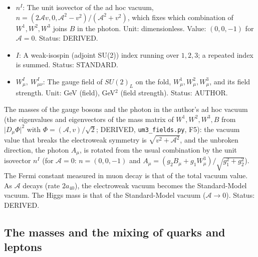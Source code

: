 \documentclass[
  10pt,
]{article}
\begin{document}
\begin{itemize}
  \(B_\mu,\ B_{\mu\nu}\): The hypercharge gauge field of \(U(1)_Y\) on
  the fold and its field strength. Unit: GeV (field), GeV\(^2\) (field
  strength). Status: AUTHOR.
\item
  \(n^I\): The unit isovector of the ad hoc vacuum,
  \(n = (2\mathcal{A}v, 0, \mathcal{A}^2 - v^2)/(\mathcal{A}^2 + v^2)\),
  which fixes which combination of \(W^1, W^2, W^3\) joins \(B\) in the
  photon. Unit: dimensionless. Value: \((0, 0, -1)\) for
  \(\mathcal{A} = 0\). Status: DERIVED.
\item
  \(I\): A weak-isospin (adjoint SU(2)) index running over \(1, 2, 3\);
  a repeated index is summed. Status: STANDARD.
\item
  \(W^I_\mu,\ W^I_{\mu\nu}\): The gauge field of \(SU(2)_L\) on the
  fold, \(W^1_\mu, W^2_\mu, W^3_\mu\), and its field strength. Unit: GeV
  (field), GeV\(^2\) (field strength). Status: AUTHOR.
\end{itemize}

The masses of the gauge bosons and the photon in the author's ad hoc
vacuum (the eigenvalues and eigenvectors of the mass matrix of
\(W^1, W^2, W^3, B\) from \(\lvert D_\mu\Phi\rvert^2\) with
\(\Phi = (\mathcal{A}, v)/\sqrt2\); DERIVED, \texttt{um3\_fields.py},
F5): the vacuum value that breaks the electroweak symmetry is
\(\sqrt{v^2 + \mathcal{A}^2}\), and the unbroken direction, the photon
\(A_\mu\), is rotated from the usual combination by the unit isovector
\(n^I\) (for \(\mathcal{A} = 0\): \(n = (0, 0, -1)\) and
\(A_\mu = (g_2B_\mu + g_1W^3_\mu)/\sqrt{g_1^2 + g_2^2}\)). The Fermi
constant measured in muon decay is that of the total vacuum value. As
\(\mathcal{A}\) decays (rate \(2a_{40}\)), the electroweak vacuum
becomes the Standard-Model vacuum. The Higgs mass is that of the
Standard-Model vacuum (\(\mathcal{A} \to 0\)). Status: DERIVED.

\hypertarget{the-masses-and-the-mixing-of-quarks-and-leptons}{%
\subsection{The masses and the mixing of quarks and
leptons}\label{the-masses-and-the-mixing-of-quarks-and-leptons}}
\end{document}
